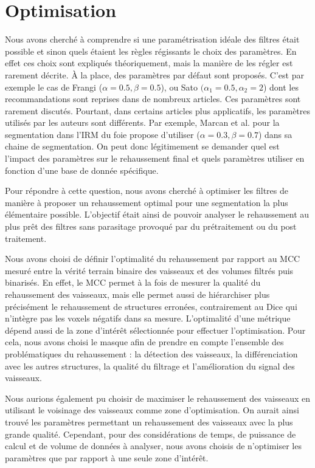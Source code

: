 \section{Optimisation}

Nous avons cherché à comprendre si une paramétrisation idéale des filtres était possible et sinon quels étaient les règles régissants le choix des paramètres. En effet ces choix sont expliqués théoriquement, mais la manière de les régler est rarement décrite. À la place, des paramètres par défaut sont proposés. C'est par exemple le cas de Frangi ($\alpha=0.5,\beta=0.5$), ou Sato $(\alpha_1=0.5,\alpha_2=2$) dont les recommandations sont reprises dans de nombreux articles. Ces paramètres sont rarement discutés. Pourtant, dans certains articles plus applicatifs, les paramètres utilisés par les auteurs sont différents. Par exemple, Marcan et al. \cite{Marcan2014_vessel_seg} pour la segmentation dans l'IRM du foie propose d'utiliser ($\alpha=0.3,\beta=0.7$) dans sa chaine de segmentation. On peut donc légitimement se demander quel est l'impact des paramètres sur le rehaussement final et quels paramètres utiliser en fonction d'une base de donnée spécifique.

Pour répondre à cette question, nous avons cherché à optimiser les filtres de manière à proposer un rehaussement optimal pour une segmentation la plus élémentaire possible. L'objectif était ainsi de pouvoir analyser le rehaussement au plus prêt des filtres sans parasitage provoqué par du prétraitement ou du post traitement.

Nous avons choisi de définir l'optimalité du rehaussement par rapport au MCC mesuré entre la vérité terrain binaire des vaisseaux et des volumes filtrés puis binarisés. En effet, le MCC permet à la fois de mesurer la qualité du rehaussement des vaisseaux, mais elle permet aussi de hiérarchiser plus précisément le rehaussement de structures erronées, contrairement au Dice qui n'intègre pas les voxels négatifs dans sa mesure. L'optimalité d'une métrique dépend aussi de la zone d'intérêt sélectionnée pour effectuer l'optimisation. Pour cela, nous avons choisi le masque \maskglobal afin de prendre en compte l'ensemble des problématiques du rehaussement : la détection des vaisseaux, la  différenciation avec les autres structures, la qualité du filtrage et l'amélioration du signal des vaisseaux. 

Nous aurions également pu choisir de maximiser le rehaussement des vaisseaux en utilisant le voisinage des vaisseaux comme zone d'optimisation. On aurait ainsi trouvé les paramètres permettant un rehaussement des vaisseaux avec la plus grande qualité. Cependant, pour des considérations de temps, de puissance de calcul et de volume de données à analyser, nous avons choisis de n'optimiser les paramètres que par rapport à une seule zone d'intérêt.

